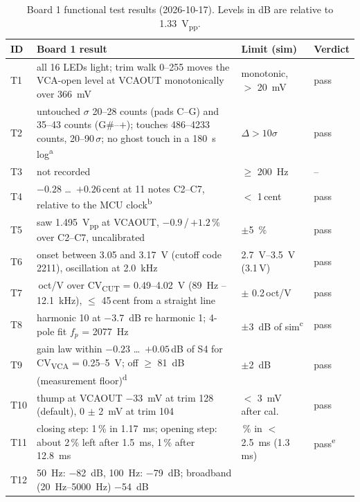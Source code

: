 \documentclass[11pt,a4paper]{article}
\newcommand{\sub}[1]{\textsubscript{#1}}
\begin{document}
\begin{table}[ht]
\centering\small
\caption{Board 1 functional test results (2026-10-17). Levels in dB are relative to \SI{1.33}{V_{pp}}.}\label{tab:board1}
\footnotesize\setlength{\tabcolsep}{4pt}
\begin{tabularx}{\textwidth}{@{}l >{\raggedright\arraybackslash}X >{\raggedright\arraybackslash}p{2.9cm} >{\raggedright\arraybackslash}p{1.45cm}@{}}
\toprule
ID & Board 1 result & Limit (sim) & Verdict \\
\midrule
T1 & all 16 LEDs light; trim walk 0--255 moves the VCA-open level at VCAOUT monotonically over
  \SI{366}{mV} & monotonic, $>$ \SI{20}{mV} & pass \\
T2 & untouched $\sigma$ 20--28 counts (pads C--G) and 35--43 counts (G\#--$+$); touches 486--4233 counts,
  20--90\,$\sigma$; no ghost touch in a \SI{180}{s} log\textsuperscript{a} & $\Delta > 10\sigma$ & pass \\
T3 & not recorded & $\geq$ \SI{200}{Hz} & -- \\
T4 & $-0.28$ \ldots\ $+0.26$\,cent at 11 notes C2--C7, relative to the MCU clock\textsuperscript{b} & $<$ 1\,cent & pass \\
T5 & saw \SI{1.495}{V_{pp}} at VCAOUT, $-0.9$\,/\,$+1.2$\,\% over C2--C7, uncalibrated & $\pm$\SI{5}{\percent} & pass \\
T6 & onset between 3.05 and \SI{3.17}{V} (cutoff code 2211), oscillation at \SI{2.0}{kHz} & \SIrange{2.7}{3.5}{V} (3.1\,V) & pass \\
T7 & 2.01\,oct/V over CV\sub{CUT} = 0.49--\SI{4.02}{V} (\SI{89}{Hz} -- \SI{12.1}{kHz}), $\leq$ 45\,cent from a straight line
  & 2.05 $\pm$ 0.2\,oct/V & pass \\
T8 & harmonic 10 at \SI{-3.7}{dB} re harmonic 1; 4-pole fit $f_p$ = \SI{2077}{Hz} & $\pm$\SI{3}{dB} of
  sim\textsuperscript{c} & pass \\
T9 & gain law within $-0.23$ \ldots\ $+0.05$\,dB of S4 for CV\sub{VCA} = 0.25--\SI{5}{V}; off $\geq$ \SI{81}{dB}
  (measurement floor)\textsuperscript{d} & $\pm$\SI{2}{dB} & pass \\
T10 & thump at VCAOUT \SI{-33}{mV} at trim 128 (default), 0 $\pm$ \SI{2}{mV} at trim 104 & $<$ \SI{3}{mV} after cal.\ & pass \\
T11 & closing step: 1\,\% in \SI{1.17}{ms}; opening step: about 2\,\% left after \SI{1.5}{ms}, 1\,\% after
  \SI{12.8}{ms} & 1\,\% in $<$ \SI{2.5}{ms} (1.3\,ms) & pass\textsuperscript{e} \\
T12 & \SI{50}{Hz}: \SI{-82}{dB}, \SI{100}{Hz}: \SI{-79}{dB}; broadband (\SIrange{20}{5000}{Hz}) \SI{-54}{dB}

\end{tabularx}
\end{table}
\end{document}
